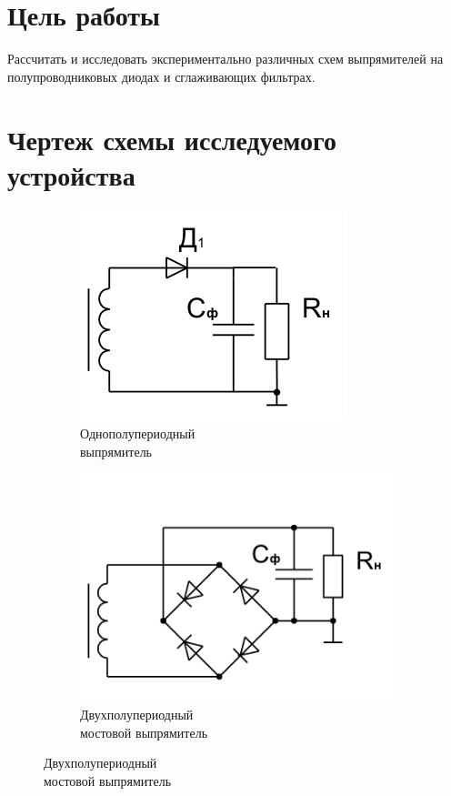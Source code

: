 





\section{Цель работы}

Рассчитать и исследовать экспериментально различных схем выпрямителей на полупроводниковых диодах и сглаживающих фильтрах.

\section{Чертеж схемы исследуемого устройства}
\begin{figure}[h]
\centering
\begin{subfigure}[b]{0.35\textwidth}
\includegraphics[scale=0.85]{img/diod.png}
\caption{Однополупериодный \\выпрямитель}\label{figure:2.1:a}
\end{subfigure}
\begin{subfigure}[b]{0.35\textwidth}
\includegraphics[scale=0.5]{img/4diods.png}
\caption{Двухполупериодный \\мостовой выпрямитель}\label{figure:2.1:b}
\end{subfigure}
\end{figure}

